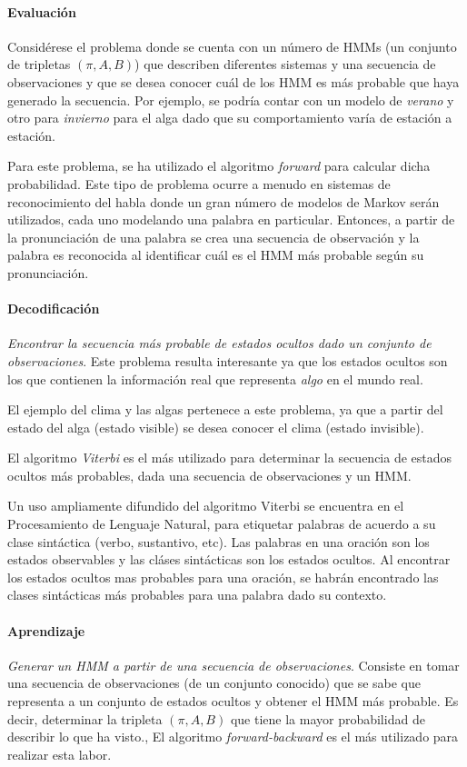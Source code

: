 \documentclass{article}
\begin{document}
\paragraph{Evaluación} 
\label{par:evaluación}
Considérese el problema donde se cuenta con un número de HMMs (un conjunto de tripletas $(\pi,A,B)$) que describen diferentes sistemas y una secuencia de observaciones y que se desea conocer cuál de los HMM es más probable que haya generado la secuencia.
Por ejemplo, se podría contar con un modelo de \emph{verano} y otro para \emph{invierno} para el alga dado que su comportamiento varía de estación a estación.

Para este problema, se ha utilizado el algoritmo \emph{forward} para calcular dicha probabilidad.
Este tipo de problema ocurre a menudo en sistemas de reconocimiento del habla donde un gran número de modelos de Markov serán utilizados, cada uno modelando una palabra en particular.
Entonces, a partir de la pronunciación de una palabra se crea una secuencia de observación y la palabra es reconocida al identificar cuál es el HMM más probable según su pronunciación.

\paragraph{Decodificación} 
\label{par:decodificación}
\emph{Encontrar la secuencia más probable de estados ocultos dado un conjunto de observaciones}.
Este problema resulta interesante ya que los estados ocultos son los que contienen la información real que representa \emph{algo} en el mundo real.

El ejemplo del clima y las algas pertenece a este problema, ya que a partir del estado del alga (estado visible) se desea conocer el clima (estado invisible).

El algoritmo \emph{Viterbi} es el más utilizado para determinar la secuencia de estados ocultos más probables, dada una secuencia de observaciones y un HMM.

Un uso ampliamente difundido del algoritmo Viterbi se encuentra en el Procesamiento de Lenguaje Natural, para etiquetar palabras de acuerdo a su clase sintáctica (verbo, sustantivo, etc).
Las palabras en una oración son los estados observables y las cláses sintácticas son los estados ocultos.
Al encontrar los estados ocultos mas probables para una oración, se habrán encontrado las clases sintácticas más probables para una palabra dado su contexto.

\paragraph{Aprendizaje}
\label{par:aprendizaje}
\emph{Generar un HMM a partir de una secuencia de observaciones}.
Consiste en tomar una secuencia de observaciones (de un conjunto conocido) que se sabe que representa a un conjunto de estados ocultos y obtener el HMM más probable.
Es decir, determinar la tripleta $(\pi,A,B)$ que tiene la mayor probabilidad de describir lo que ha visto.,
El algoritmo \emph{forward-backward} es el más utilizado para realizar esta labor.

\newpage 
\nocite{*}

 
\end{document}
